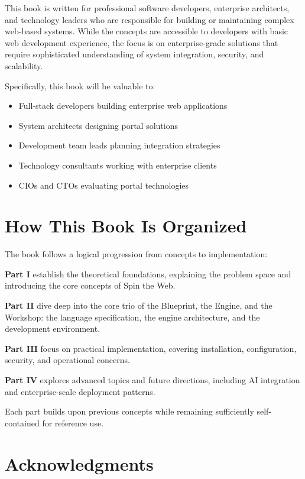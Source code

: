 This book is written for professional software developers, enterprise architects, and technology leaders who are responsible for building or maintaining complex web-based systems. While the concepts are accessible to developers with basic web development experience, the focus is on enterprise-grade solutions that require sophisticated understanding of system integration, security, and scalability.

Specifically, this book will be valuable to:
\begin{itemize}
\item Full-stack developers building enterprise web applications
\item System architects designing portal solutions
\item Development team leads planning integration strategies
\item Technology consultants working with enterprise clients
\item CIOs and CTOs evaluating portal technologies
\end{itemize}

\section*{How This Book Is Organized}

The book follows a logical progression from concepts to implementation:

\textbf{Part I} establish the theoretical foundations, explaining the problem space and introducing the core concepts of Spin the Web.

\textbf{Part II} dive deep into the core trio of the Blueprint, the Engine, and the Workshop: the \wbdl language specification, the \webspinner engine architecture, and the \studio development environment.

\textbf{Part III} focus on practical implementation, covering installation, configuration, security, and operational concerns.

\textbf{Part IV} explores advanced topics and future directions, including AI integration and enterprise-scale deployment patterns.

Each part builds upon previous concepts while remaining sufficiently self-contained for reference use.

\section*{Acknowledgments}

